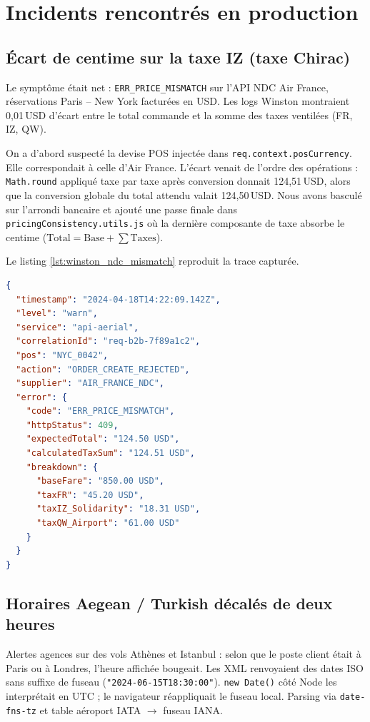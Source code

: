 \section{Incidents rencontrés en production}

\subsection{Écart de centime sur la taxe IZ (taxe Chirac)}

Le symptôme était net : \texttt{ERR\_PRICE\_MISMATCH} sur l'API NDC Air France, réservations Paris -- New York facturées en USD. Les logs Winston montraient 0,01\,USD d'écart entre le total commande et la somme des taxes ventilées (FR, IZ, QW).

On a d'abord suspecté la devise POS injectée dans \texttt{req.context.posCurrency}. Elle correspondait à celle d'Air France. L'écart venait de l'ordre des opérations : \texttt{Math.round} appliqué taxe par taxe après conversion donnait 124,51\,USD, alors que la conversion globale du total attendu valait 124,50\,USD. Nous avons basculé sur l'arrondi bancaire et ajouté une passe finale dans \texttt{pricingConsistency.utils.js} où la dernière composante de taxe absorbe le centime ($\text{Total} = \text{Base} + \sum \text{Taxes}$).

Le listing \ref{lst:winston_ndc_mismatch} reproduit la trace capturée.

\begin{lstlisting}[language=json, caption={Log Winston --- rejet NDC écart de taxes}, label={lst:winston_ndc_mismatch}]
{
  "timestamp": "2024-04-18T14:22:09.142Z",
  "level": "warn",
  "service": "api-aerial",
  "correlationId": "req-b2b-7f89a1c2",
  "pos": "NYC_0042",
  "action": "ORDER_CREATE_REJECTED",
  "supplier": "AIR_FRANCE_NDC",
  "error": {
    "code": "ERR_PRICE_MISMATCH",
    "httpStatus": 409,
    "expectedTotal": "124.50 USD",
    "calculatedTaxSum": "124.51 USD",
    "breakdown": {
      "baseFare": "850.00 USD",
      "taxFR": "45.20 USD",
      "taxIZ_Solidarity": "18.31 USD",
      "taxQW_Airport": "61.00 USD"
    }
  }
}
\end{lstlisting}

\subsection{Horaires Aegean / Turkish décalés de deux heures}

Alertes agences sur des vols Athènes et Istanbul : selon que le poste client était à Paris ou à Londres, l'heure affichée bougeait. Les XML renvoyaient des dates ISO sans suffixe de fuseau (\texttt{"2024-06-15T18:30:00"}). \texttt{new Date()} côté Node les interprétait en UTC ; le navigateur réappliquait le fuseau local. Parsing via \texttt{date-fns-tz} et table aéroport IATA $\rightarrow$ fuseau IANA.

